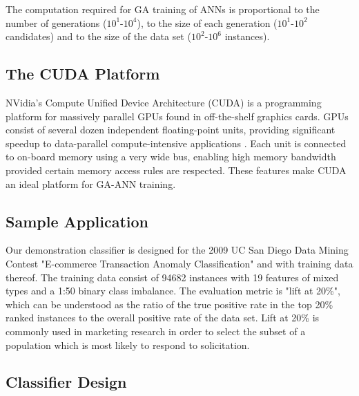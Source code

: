 \documentclass[11pt]{article}       %
\begin{document}
The computation required for GA training of ANNs is proportional to the number of generations ($10^1$-$10^4$), to the size of each generation ($10^1$-$10^2$ candidates) and to the size of the data set ($10^2$-$10^6$ instances).

\subsection{The CUDA Platform} \label{cuda}
NVidia's Compute Unified Device Architecture (CUDA) is a programming platform for massively parallel GPUs found in off-the-shelf graphics cards. GPUs consist of several dozen independent floating-point units, providing significant speedup to data-parallel compute-intensive applications \cite{cuda}. Each unit is connected to on-board memory using a very wide bus, enabling high memory bandwidth provided certain memory access rules are respected. These features make CUDA an ideal platform for GA-ANN training.

\subsection{Sample Application} \label{contest}
Our demonstration classifier is designed for the 2009 UC San Diego Data Mining Contest "E-commerce Transaction Anomaly Classification" \cite{UCSG-Contest} and with training data thereof. The training data consist of 94682 instances with 19 features of mixed types and a 1:50 binary class imbalance. The evaluation metric is "lift at 20\%", which can be understood as the ratio of the true positive rate in the top 20\% ranked instances to the overall positive rate of the data set.  Lift at 20\% is commonly used in marketing research in order to select the subset of a population which is most likely to respond to solicitation.

\subsection{Classifier Design} \label{design}
\end{document}
